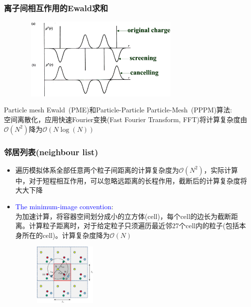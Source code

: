 \frame
{
	\frametitle{离子间相互作用的\textrm{Ewald}求和}
\begin{figure}[h!]
\centering
\vspace*{-0.20in}
\includegraphics[height=1.6in,width=3.32in,viewport=0 0 1800 955,clip]{Figures/Ewald_method-2.png}
\caption{\fontsize{5.5pt}{2.2pt}}%
\label{Ewald_method-2}
\end{figure}
\textrm{Particle mesh Ewald~(PME)}和\textrm{Particle-Particle Particle-Mesh~(PPPM)}算法:\\
空间离散化，应用快速\textrm{Fourier}变换\textrm{(Fast Fourier Transform, FFT)}将计算复杂度由$\mathscr{O}(N^2)$降为$\mathscr{O}(N\log(N))$
}

\frame
{
	\frametitle{邻居列表\textrm{(neighbour list)}}
	\begin{itemize}
		\item 遍历模拟体系全部任意两个粒子间距离的计算复杂度为$\mathscr{O}(N^2)$，实际计算中，对于短程相互作用，可以忽略远距离的长程作用，截断后的计算复杂度将大大下降
		\item \textcolor{blue}{\textrm{The minimum-image convention}}:\\为加速计算，将容器空间划分成小的立方体\textrm{(cell)}，每个\textrm{cell}的边长为截断距离。计算粒子距离时，对于给定粒子只须遍历最近邻27个\textrm{cell}内的粒子(包括本身所在的\textrm{cell})。计算复杂度降为$\mathscr{O}(N)$
\begin{figure}[h!]
\centering
\vspace*{-0.18in}
\includegraphics[height=1.2in,width=1.28in,viewport=0 0 180 180,clip]{Figures/Schematic-showing-the-closest-neighbors-of-atom_A-in-the-primary-simulation-cell-as-determined-by-the-minimum-image-criterion.jpg}
\caption{\fontsize{5.5pt}{2.2pt}}%
\label{Minimum-image-convention}
\end{figure}
	\end{itemize}
	
}

